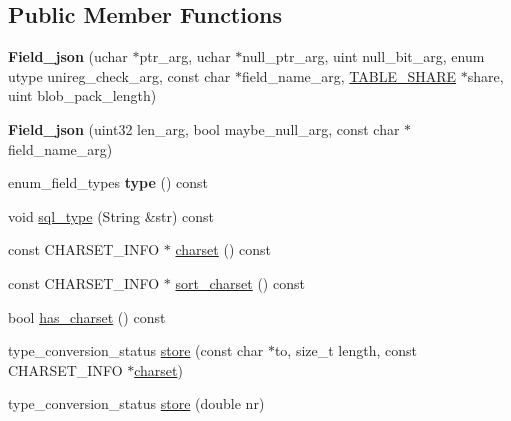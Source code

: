 \subsection*{Public Member Functions}
\begin{DoxyCompactItemize}
\item 
\mbox{\label{classField__json_ac75f08dce481c4b2bbe7a459e8310ef9}} 
{\bfseries Field\+\_\+json} (uchar $\ast$ptr\+\_\+arg, uchar $\ast$null\+\_\+ptr\+\_\+arg, uint null\+\_\+bit\+\_\+arg, enum utype unireg\+\_\+check\+\_\+arg, const char $\ast$field\+\_\+name\+\_\+arg, \mbox{\hyperlink{structTABLE__SHARE}{T\+A\+B\+L\+E\+\_\+\+S\+H\+A\+RE}} $\ast$share, uint blob\+\_\+pack\+\_\+length)
\item 
\mbox{\label{classField__json_a9de674b8e75a87ecd91880a2350e9faf}} 
{\bfseries Field\+\_\+json} (uint32 len\+\_\+arg, bool maybe\+\_\+null\+\_\+arg, const char $\ast$field\+\_\+name\+\_\+arg)
\item 
\mbox{\label{classField__json_a5a9e31ff7a6ed0f789747e7ef79a000f}} 
enum\+\_\+field\+\_\+types {\bfseries type} () const
\item 
void \mbox{\hyperlink{classField__json_acced64a853ec0146230e4152054a4b65}{sql\+\_\+type}} (String \&str) const
\item 
const C\+H\+A\+R\+S\+E\+T\+\_\+\+I\+N\+FO $\ast$ \mbox{\hyperlink{classField__json_a1ea43b4e58fea6167615f66a74bdda5e}{charset}} () const
\item 
const C\+H\+A\+R\+S\+E\+T\+\_\+\+I\+N\+FO $\ast$ \mbox{\hyperlink{classField__json_a7a95dcafef3f774f2636f230996b0849}{sort\+\_\+charset}} () const
\item 
bool \mbox{\hyperlink{classField__json_a935f845046fd5b3e0a031e736cca69e2}{has\+\_\+charset}} () const
\item 
type\+\_\+conversion\+\_\+status \mbox{\hyperlink{classField__json_a158c3f1c43417d7f5d4aa8cbd572aaf5}{store}} (const char $\ast$to, size\+\_\+t length, const C\+H\+A\+R\+S\+E\+T\+\_\+\+I\+N\+FO $\ast$\mbox{\hyperlink{classField__json_a1ea43b4e58fea6167615f66a74bdda5e}{charset}})
\item 
\mbox{\label{classField__json_a2242a237a4e212ba5eadba6f5053df3c}} 
type\+\_\+conversion\+\_\+status \mbox{\hyperlink{classField__json_a2242a237a4e212ba5eadba6f5053df3c}{store}} (double nr)

\end{DoxyCompactItemize}
